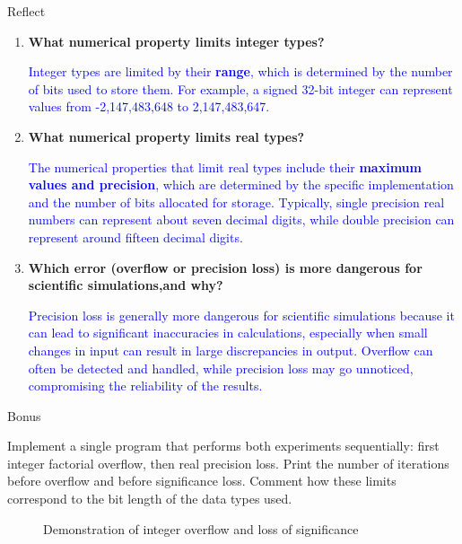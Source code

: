 \documentclass{homework}
\begin{document}
\question
Reflect
\begin{enumerate}

    \item \textbf{What numerical property limits integer types?}


    \textcolor{blue}{Integer types are limited by their \textbf{range}, which is determined by the number of bits used to store them. For example, a signed 32-bit integer can represent values from -2,147,483,648 to 2,147,483,647.}

    
    \vspace{10mm}
    
    \item \textbf{What numerical property limits real types?}

    \textcolor{blue}{The numerical properties that limit real types include their \textbf{maximum values and precision}, which are determined by the specific implementation and the number of bits allocated for storage. Typically, single precision real numbers can represent about seven decimal digits, while double precision can represent around fifteen decimal digits}.

    \vspace{10mm}
    
    \item \textbf{Which error (overflow or precision loss) is more dangerous for scientific simulations,and why?}



    \textcolor{blue}{Precision loss is generally more dangerous for scientific simulations because it can lead to significant inaccuracies in calculations, especially when small changes in input can result in large discrepancies in output. Overflow can often be detected and handled, while precision loss may go unnoticed, compromising the reliability of the results.}
\end{enumerate}



\newpage
\vfill

\question 
Bonus

Implement a single program that performs both experiments sequentially: first integer
factorial overflow, then real precision loss. Print the number of iterations before overflow
and before significance loss. Comment how these limits correspond to the bit length of
the data types used.

\begin{sol}

\begin{figure}[h!]
    \noindent
    \begin{minipage}[t]{0.48\textwidth}
    \end{minipage}
    \hfill
    \begin{minipage}[t]{0.48\textwidth}
    \end{minipage}
    \caption{Demonstration of integer overflow and loss of significance}
    \label{fig:comparision of integer flow and loss of significance}
\end{figure}

    
\end{sol}

%
%
\end{document}
